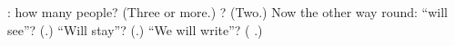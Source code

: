 \begin{tcolorbox}[breakable,colback=teal!4,colframe=teal!35!black,title={Before you move on}]
\textbf{}: how many people? (Three or more.) \textbf{}? (Two.) Now the other way round: \textquotedblleft{}will see\textquotedblright{}? (\textbf{}.) \textquotedblleft{}Will stay\textquotedblright{}? (\textbf{}.) \textquotedblleft{}We will write\textquotedblright{}? (\textbf{ }.)
\end{tcolorbox}
